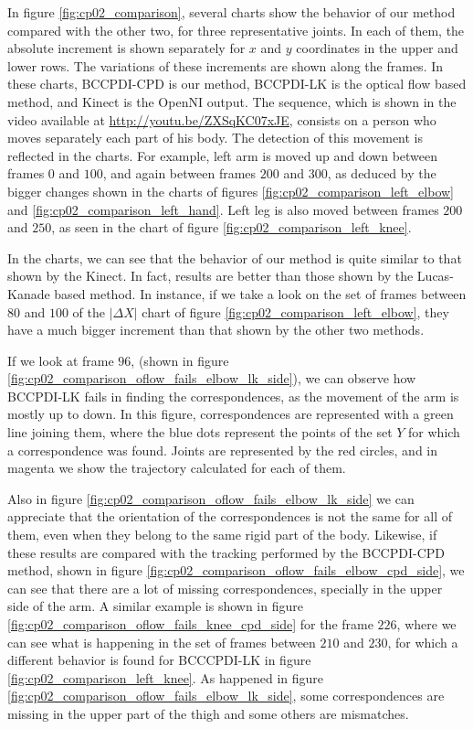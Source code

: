In figure \ref{fig:cp02_comparison}, several charts show the behavior of our method compared with the other two, for three 
representative joints. In each of them, the absolute increment is shown separately for $x$ and $y$ coordinates in the 
upper and lower rows. The variations of these increments are shown along the frames. In these charts, BCCPDI-CPD is 
our method, BCCPDI-LK is the optical flow based method, and Kinect is the OpenNI output. The sequence, which is shown in 
the video available at \url{http://youtu.be/ZXSqKC07xJE}, consists on a person who moves separately each part of 
his body. The detection of this movement is reflected in the charts. For example, left arm is moved up and down between 
frames $0$ and $100$, and again between frames $200$ and $300$, as deduced by the bigger changes shown in the charts of 
figures \ref{fig:cp02_comparison_left_elbow} and \ref{fig:cp02_comparison_left_hand}. Left leg is also moved between frames $200$ 
and $250$, as seen in the chart of figure \ref{fig:cp02_comparison_left_knee}.

In the charts, we can see that the behavior of our method is quite similar to that shown by the Kinect. In fact, results are better than those shown by the Lucas-Kanade based method. In instance, if we take a look on the set of 
frames between $80$ and $100$ of the $|\Delta X|$ chart of figure \ref{fig:cp02_comparison_left_elbow}, they have a much 
bigger increment than that shown by the other two methods. 

If we look at frame $96$, (shown in figure \ref{fig:cp02_comparison_oflow_fails_elbow_lk_side}), we can observe how BCCPDI-LK fails in finding the correspondences, as 
the movement of the arm is mostly up to down. In this figure, correspondences are represented with a green line joining 
them, where the blue dots represent the points of the set $Y$ for which a correspondence was found. Joints are represented by the red circles, and in magenta 
we show the trajectory calculated for each of them. 

Also in figure 
\ref{fig:cp02_comparison_oflow_fails_elbow_lk_side} we can appreciate that the 
orientation of the correspondences is not the same for all of them, even when they belong to the same rigid part of the 
body. Likewise, if these results are compared with the tracking performed by the BCCPDI-CPD method, shown in figure 
\ref{fig:cp02_comparison_oflow_fails_elbow_cpd_side}, we can see that there are a lot of missing correspondences, specially 
in the upper side of the arm. A similar example is shown in figure \ref{fig:cp02_comparison_oflow_fails_knee_cpd_side} for 
the frame $226$, where we can see what is happening in the set of frames between $210$ and $230$, for which a 
different behavior is found for BCCCPDI-LK in figure \ref{fig:cp02_comparison_left_knee}. As happened in figure 
\ref{fig:cp02_comparison_oflow_fails_elbow_lk_side}, some correspondences are missing in the upper part of the thigh and some 
others are mismatches.

